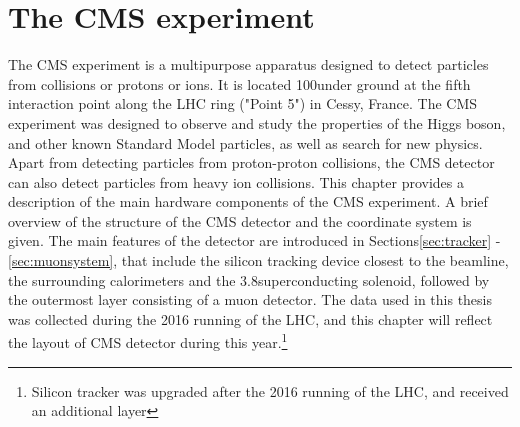 \chapter{The CMS experiment}\label{sec:CMS}
\noindent\justify
The CMS experiment is a multipurpose apparatus designed to detect particles from collisions or protons or ions. 
It is located 100\m under ground at the fifth interaction point along the LHC ring ("Point 5") in Cessy, France. 
The CMS experiment was designed to observe and study the properties of the Higgs boson, and other known Standard Model particles, as well as search for new physics. 
Apart from detecting particles from proton-proton collisions, the CMS detector can also detect particles from heavy ion collisions.  
\newpara
\noindent\justify
This chapter provides a description of the main hardware components of the CMS experiment. 
A brief overview of the structure of the CMS detector and the coordinate system is given.  
The main features of the detector are introduced in Sections\ref{sec:tracker} -\ref{sec:muonsystem}, that include the silicon tracking device closest to the beamline, the surrounding calorimeters and the 3.8\T superconducting solenoid, followed by the outermost layer consisting of a muon detector.  
The data used in this thesis was collected during the 2016 running of the LHC, and this chapter will reflect the layout of CMS detector during this year.\footnote{Silicon tracker was upgraded after the 2016 running of the LHC, and received an additional layer} 
\newpage
